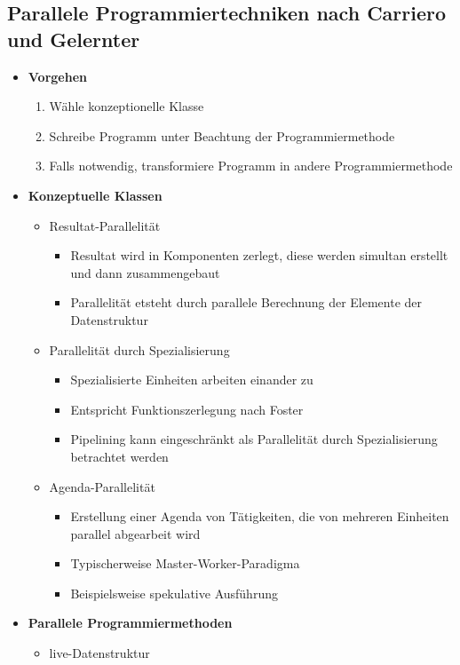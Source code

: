 \subsection{Parallele Programmiertechniken nach Carriero und Gelernter}
\begin{itemize}
	\item \textbf{Vorgehen}
	\begin{enumerate}
		\item Wähle konzeptionelle Klasse
		\item Schreibe Programm unter Beachtung der Programmiermethode
		\item Falls notwendig, transformiere Programm in andere Programmiermethode
	\end{enumerate}
	\item \textbf{Konzeptuelle Klassen}
	\begin{itemize}
		\item Resultat-Parallelität
		\begin{itemize}
			\item Resultat wird in Komponenten zerlegt, diese werden simultan erstellt und dann zusammengebaut
			\item Parallelität etsteht durch parallele Berechnung der Elemente der Datenstruktur
		\end{itemize}
		\item Parallelität durch Spezialisierung
		\begin{itemize}
			\item Spezialisierte Einheiten arbeiten einander zu
			\item Entspricht Funktionszerlegung nach Foster
			\item Pipelining kann eingeschränkt als Parallelität durch Spezialisierung betrachtet werden
		\end{itemize}
		\item Agenda-Parallelität
		\begin{itemize}
			\item Erstellung einer Agenda von Tätigkeiten, die von mehreren Einheiten parallel abgearbeit wird
			\item Typischerweise Master-Worker-Paradigma
			\item Beispielsweise spekulative Ausführung
		\end{itemize}
	\end{itemize}
	\item \textbf{Parallele Programmiermethoden}
	\begin{itemize}
		\item live-Datenstruktur

\end{itemize}
\end{itemize}
